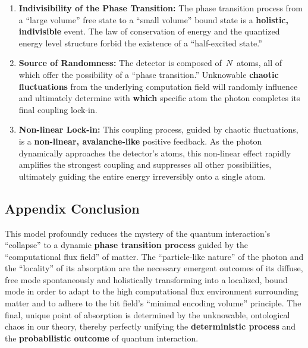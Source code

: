 \documentclass[11pt, a4paper]{article}
\begin{document}
\begin{enumerate}
    \item \textbf{Indivisibility of the Phase Transition:} The phase transition process from a ``large volume'' free state to a ``small volume'' bound state is a \textbf{holistic, indivisible} event. The law of conservation of energy and the quantized energy level structure forbid the existence of a ``half-excited state.''
    \item \textbf{Source of Randomness:} The detector is composed of~$N$~atoms, all of which offer the possibility of a ``phase transition.'' Unknowable \textbf{chaotic fluctuations} from the underlying computation field will randomly influence and ultimately determine with \textbf{which} specific atom the photon completes its final coupling lock-in.
    \item \textbf{Non-linear Lock-in:} This coupling process, guided by chaotic fluctuations, is a \textbf{non-linear, avalanche-like} positive feedback. As the photon dynamically approaches the detector's atoms, this non-linear effect rapidly amplifies the strongest coupling and suppresses all other possibilities, ultimately guiding the entire energy irreversibly onto a single atom.
\end{enumerate}

\subsection*{Appendix Conclusion}

This model profoundly reduces the mystery of the quantum interaction's ``collapse'' to a dynamic \textbf{phase transition process} guided by the ``computational flux field'' of matter. The ``particle-like nature'' of the photon and the ``locality'' of its absorption are the necessary emergent outcomes of its diffuse, free mode spontaneously and holistically transforming into a localized, bound mode in order to adapt to the high computational flux environment surrounding matter and to adhere to the bit field's ``minimal encoding volume'' principle. The final, unique point of absorption is determined by the unknowable, ontological chaos in our theory, thereby perfectly unifying the \textbf{deterministic process} and the \textbf{probabilistic outcome} of quantum interaction.
\end{document}
